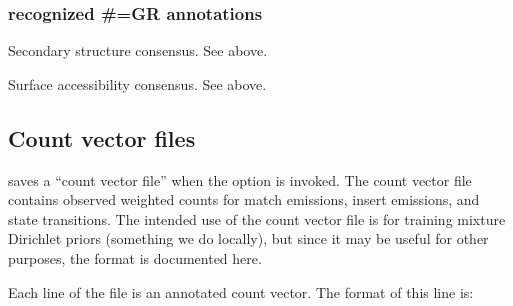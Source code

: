 \subsubsection{recognized \#=GR annotations}
\begin{wideitem}
\item [\emprog{SS}]
        Secondary structure consensus. See  above.
\item [\emprog{SA}]
        Surface accessibility consensus. See  above.
\end{wideitem}


\subsection{Count vector files}

 saves a ``count vector file'' when the 
option is invoked. The count vector file contains observed weighted
counts for match emissions, insert emissions, and state transitions.
The intended use of the count vector file is for training mixture
Dirichlet priors (something we do locally), but since it may be useful
for other purposes, the format is documented here.

Each line of the file is an annotated count vector. The format of this
line is:

